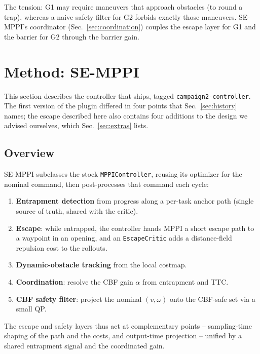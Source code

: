 \documentclass[journal]{IEEEtran}
\begin{document}
The tension: G1 may require maneuvers that approach obstacles (to round a
trap), whereas a naive safety filter for G2 forbids exactly those
maneuvers. SE-MPPI's coordinator (Sec.~\ref{sec:coordination}) couples the
escape layer for G1 and the barrier for G2 through the barrier gain.

\section{Method: SE-MPPI}
\label{sec:method}

This section describes the controller that ships, tagged
\texttt{campaign2-controller}. The first version of the plugin differed in
four points that Sec.~\ref{sec:history} names; the escape described here
also contains four additions to the design we advised ourselves, which
Sec.~\ref{sec:extras} lists.

\subsection{Overview}
\label{sec:overview}

SE-MPPI subclasses the stock \texttt{MPPIController}, reusing its
optimizer for the nominal command, then post-processes that command each
cycle:

\begin{enumerate}
\item \textbf{Entrapment detection} from progress along a per-task anchor
  path (single source of truth, shared with the critic).
\item \textbf{Escape}: while entrapped, the controller hands MPPI a short
  escape path to a waypoint in an opening, and an \texttt{EscapeCritic}
  adds a distance-field repulsion cost to the rollouts.
\item \textbf{Dynamic-obstacle tracking} from the local costmap.
\item \textbf{Coordination}: resolve the CBF gain $\alpha$ from
  entrapment and TTC.
\item \textbf{CBF safety filter}: project the nominal $(v,\omega)$ onto
  the CBF-safe set via a small QP.
\end{enumerate}

The escape and safety layers thus act at complementary points --
sampling-time shaping of the path and the costs, and output-time projection
-- unified by a shared entrapment signal and the coordinated gain.
\end{document}
